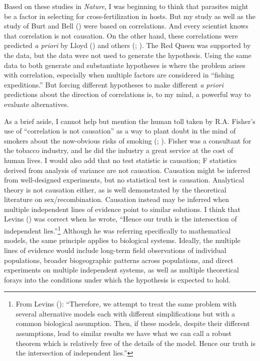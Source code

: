 \documentclass[
  letterpaper,
]{book}
\begin{document}
Based on these studies in \emph{Nature}, I was beginning to think that
parasites might be a factor in selecting for cross-fertilization in
hosts. But my study as well as the study of Burt and Bell
() were based on correlations. And every
scientist knows that correlation is not causation. On the other hand,
these correlations were predicted \emph{a priori} by Lloyd
() and others
(;
). The Red Queen
was supported by the data, but the data were not used to generate the
hypothesis. Using the same data to both generate and substantiate
hypotheses is where the problem arises with correlation, especially when
multiple factors are considered in ``fishing expeditions.'' But forcing
different hypotheses to make different \emph{a priori} predictions about
the direction of correlations is, to my mind, a powerful way to evaluate
alternatives.

As a brief aside, I cannot help but mention the human toll taken by R.A.
Fisher's use of ``correlation is not causation'' as a way to plant doubt
in the mind of smokers about the now-obvious risks of smoking
(;
). Fisher was a consultant for
the tobacco industry, and he did the industry a great service at the
cost of human lives. I would also add that no test statistic is
causation; F statistics derived from analysis of variance are not
causation. Causation might be inferred from well-designed experiments,
but no statistical test is causation. Analytical theory is not causation
either, as is well demonstrated by the theoretical literature on
sex/recombination. Causation instead may be inferred when multiple
independent lines of evidence point to similar solutions. I think that
Levins () was correct when he wrote,
``Hence our truth is the intersection of independent lies.''\footnote{From
  Levins (): ``Therefore, we attempt to
  treat the same problem with several alternative models each with
  different simplifications but with a common biological assumption.
  Then, if these models, despite their different assumptions, lead to
  similar results we have what we can call a robust theorem which is
  relatively free of the details of the model. Hence our truth is the
  intersection of independent lies.''} Although he was referring
specifically to mathematical models, the same principle applies to
biological systems. Ideally, the multiple lines of evidence would
include long-term field observations of individual populations, broader
biogeographic patterns across populations, and direct experiments on
multiple independent systems, as well as multiple theoretical forays
into the conditions under which the hypothesis is expected to hold.
\end{document}
